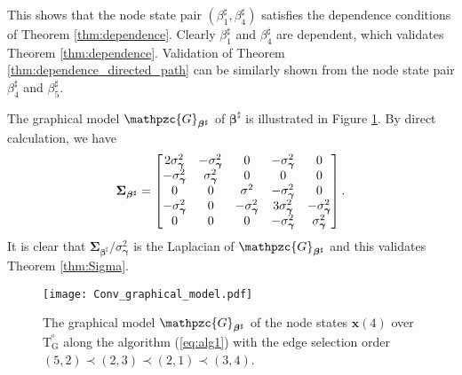 \documentclass[a4paper, 11pt]{article}
\newcommand{\1}{\mathbf{1}}
\newcommand{\xb}{\mathbf{x}}
\newcommand{\mG}{\mathrm{G}}
\newcommand{\mT}{\mathrm{T}}
\newcommand{\mTG}{\mT^{^o}_{\mG}}
\newcommand{\mGM}{\mathpzc{G}}
\newcommand{\gammab}{{\bm \gamma}}
\newcommand{\betab}{\bm{\beta}}
\newcommand{\Sigmab}{\bm{\Sigma}}
\begin{document}
This shows that the node state pair $(\beta^\sharp_1,\beta^\sharp_4)$ satisfies the dependence conditions of Theorem \ref{thm:dependence}. Clearly $\beta^\sharp_1$ and $\beta^\sharp_4$ are dependent, which validates Theorem \ref{thm:dependence}. Validation of Theorem \ref{thm:dependence_directed_path} can be similarly shown from the node state pair $\beta^\sharp_4$ and $\beta^\sharp_5$.

The graphical model $\mGM_{\betab^\sharp}$ of $\betab^\sharp$ is illustrated in Figure \ref{fig:conv_graphical_model}. By direct calculation, we have
\begin{equation}\notag
\Sigmab_{\betab^\sharp}=
\begin{bmatrix}
2\sigma_\gammab^2 & -\sigma_\gammab^2 & 0 & -\sigma_\gammab^2 & 0 \\
-\sigma_\gammab^2 & \sigma_\gammab^2 & 0 & 0 & 0 \\
0 & 0 & \sigma^2 & -\sigma_\gammab^2 & 0 \\
-\sigma_\gammab^2 & 0 & -\sigma_\gammab^2 & 3\sigma_\gammab^2 & -\sigma_\gammab^2 \\
0 & 0 & 0 & -\sigma_\gammab^2 & \sigma_\gammab^2
\end{bmatrix}.
\end{equation}
It is clear that $\Sigmab_{\betab^\sharp}/\sigma_\gammab^2$ is the Laplacian of $\mGM_{\betab^\sharp}$ and this validates Theorem \ref{thm:Sigma}.



\begin{figure}[H]
	\centering
	\texttt{[image: Conv\_graphical\_model.pdf]}
	\caption{The graphical model $\mGM_{\betab^\sharp}$ of the node states $\xb(4)$ over $\mTG$ along the algorithm (\ref{eq:alg1}) with the edge selection order $(5,2)\prec(2,3)\prec(2,1)\prec(3,4)$.}
	\label{fig:conv_graphical_model}
\end{figure}

\medskip
\end{document}
